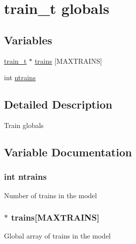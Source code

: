 \hypertarget{group__train__t__globals}{\section{train\-\_\-t globals}
\label{group__train__t__globals}
}
\subsection*{Variables}
\begin{DoxyCompactItemize}
\item 
\hyperlink{structtrain__t}{train\-\_\-t} $\ast$ \hyperlink{group__train__t__globals_ga815a41ef6431cc18d5c5671a05dbf2a2}{trains} \mbox{[}M\-A\-X\-T\-R\-A\-I\-N\-S\mbox{]}
\item 
int \hyperlink{group__train__t__globals_ga26b61b76f969e583e64b3b00193de252}{ntrains}
\end{DoxyCompactItemize}


\subsection{Detailed Description}
Train globals 

\subsection{Variable Documentation}
\hypertarget{group__train__t__globals_ga26b61b76f969e583e64b3b00193de252}{
\subsubsection[{ntrains}]{\setlength{\rightskip}{0pt plus 5cm}int ntrains}}\label{group__train__t__globals_ga26b61b76f969e583e64b3b00193de252}
Number of trains in the model \hypertarget{group__train__t__globals_ga815a41ef6431cc18d5c5671a05dbf2a2}{
\subsubsection[{trains}]{$\ast$ trains\mbox{[}M\-A\-X\-T\-R\-A\-I\-N\-S\mbox{]}}}\label{group__train__t__globals_ga815a41ef6431cc18d5c5671a05dbf2a2}
Global array of trains in the model 